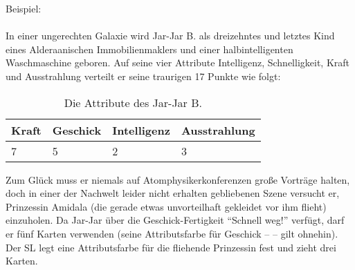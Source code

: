 Beispiel:
\\
\\
In einer ungerechten Galaxie wird Jar-Jar B. als dreizehntes und letztes Kind eines Alderaanischen Immobilienmaklers und einer halbintelligenten Waschmaschine geboren. Auf seine vier Attribute Intelligenz, Schnelligkeit, Kraft und Ausstrahlung verteilt er seine traurigen 17 Punkte wie folgt:
\begin{table}[H]
\caption{Die Attribute des Jar-Jar B.}
\begin{tabular}{|l|l|l|l|}
\hline
Kraft & Geschick & Intelligenz & Ausstrahlung \\
\hline
7 & 5 & 2 & 3\\
\hline
\end{tabular}
\end{table}
Zum Glück muss er niemals auf Atomphysikerkonferenzen große Vorträge halten, doch in einer der Nachwelt leider nicht erhalten gebliebenen Szene versucht er, Prinzessin Amidala (die gerade etwas unvorteilhaft gekleidet vor ihm flieht) einzuholen. Da Jar-Jar über die Geschick-Fertigkeit "`Schnell weg!"' verfügt, darf er fünf Karten verwenden (seine Attributsfarbe für Geschick -- \karo -- gilt ohnehin). Der SL legt eine Attributsfarbe für die fliehende Prinzessin fest und zieht drei Karten.

